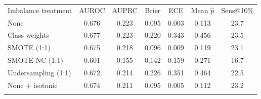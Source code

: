 \begin{tabular}{lcccccc}
\hline\noalign{\smallskip}
Imbalance treatment & AUROC & AUPRC & Brier & ECE & Mean $\hat p$ & Sens@10\% \\
\noalign{\smallskip}\hline\noalign{\smallskip}
None & 0.676 & 0.223 & 0.095 & 0.003 & 0.113 & 23.7 \\
Class weights & 0.677 & 0.223 & 0.220 & 0.343 & 0.456 & 23.5 \\
SMOTE (1:1) & 0.675 & 0.218 & 0.096 & 0.009 & 0.119 & 23.1 \\
SMOTE-NC (1:1) & 0.601 & 0.155 & 0.142 & 0.159 & 0.271 & 16.7 \\
Undersampling (1:1) & 0.672 & 0.214 & 0.226 & 0.351 & 0.464 & 22.5 \\
None + isotonic & 0.674 & 0.211 & 0.095 & 0.005 & 0.112 & 23.2 \\
\noalign{\smallskip}\hline
\end{tabular}
